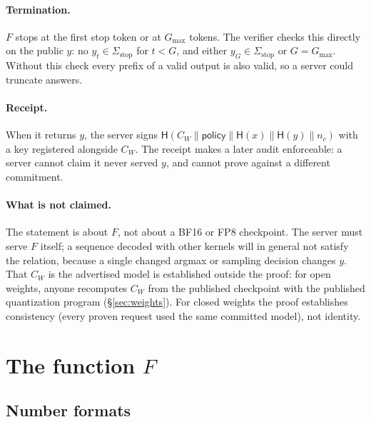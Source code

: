 \documentclass[11pt]{article}
\begin{document}
\paragraph{Termination.}
\(F\) stops at the first stop token or at \(G_{\max}\) tokens.
The verifier checks this directly on the public \(y\): no \(y_t \in \Sigma_{\mathrm{stop}}\) for \(t < G\), and either \(y_G \in \Sigma_{\mathrm{stop}}\) or \(G = G_{\max}\).
Without this check every prefix of a valid output is also valid, so a server could truncate answers.

\paragraph{Receipt.}
When it returns \(y\), the server signs \(\mathsf{H}(C_W \| \mathsf{policy} \| \mathsf{H}(x) \| \mathsf{H}(y) \| n_c)\) with a key registered alongside \(C_W\).
The receipt makes a later audit enforceable: a server cannot claim it never served \(y\), and cannot prove against a different commitment.

\paragraph{What is not claimed.}
The statement is about \(F\), not about a BF16 or FP8 checkpoint.
The server must serve \(F\) itself; a sequence decoded with other kernels will in general not satisfy the relation, because a single changed argmax or sampling decision changes \(y\).
That \(C_W\) is the advertised model is established outside the proof: for open weights, anyone recomputes \(C_W\) from the published checkpoint with the published quantization program (\S\ref{sec:weights}).
For closed weights the proof establishes consistency (every proven request used the same committed model), not identity.

\section{The function \texorpdfstring{\(F\)}{F}}
\label{sec:F}

\subsection{Number formats}
\label{sec:formats}
\end{document}
